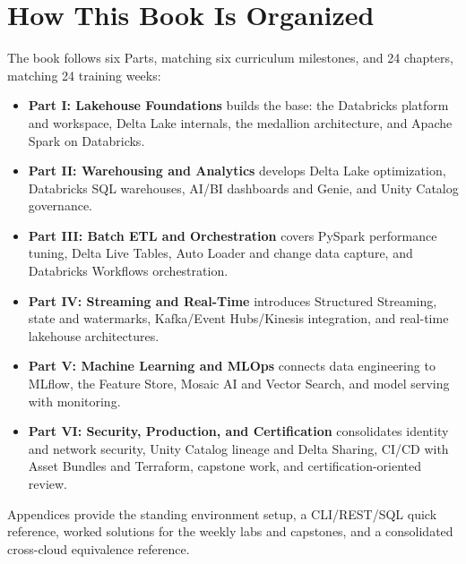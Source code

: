 \section*{How This Book Is Organized}
The book follows six Parts, matching six curriculum milestones, and 24 chapters, matching 24 training weeks:
\begin{itemize}
    \item \textbf{Part I: Lakehouse Foundations} builds the base: the Databricks platform and workspace, Delta Lake internals, the medallion architecture, and Apache Spark on Databricks.
    \item \textbf{Part II: Warehousing and Analytics} develops Delta Lake optimization, Databricks SQL warehouses, AI/BI dashboards and Genie, and Unity Catalog governance.
    \item \textbf{Part III: Batch ETL and Orchestration} covers PySpark performance tuning, Delta Live Tables, Auto Loader and change data capture, and Databricks Workflows orchestration.
    \item \textbf{Part IV: Streaming and Real-Time} introduces Structured Streaming, state and watermarks, Kafka/Event Hubs/Kinesis integration, and real-time lakehouse architectures.
    \item \textbf{Part V: Machine Learning and MLOps} connects data engineering to MLflow, the Feature Store, Mosaic AI and Vector Search, and model serving with monitoring.
    \item \textbf{Part VI: Security, Production, and Certification} consolidates identity and network security, Unity Catalog lineage and Delta Sharing, CI/CD with Asset Bundles and Terraform, capstone work, and certification-oriented review.
\end{itemize}
Appendices provide the standing environment setup, a CLI/REST/SQL quick reference, worked solutions for the weekly labs and capstones, and a consolidated cross-cloud equivalence reference.

